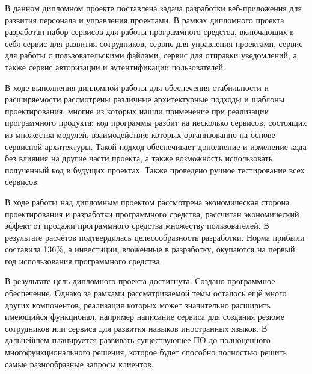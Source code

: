
В данном дипломном проекте поставлена задача разработки веб-при\-ложения для развития персонала и управления проектами. В рамках дипломного проекта разработан набор сервисов для работы программного средства, включающих в себя сервис для развития сотрудников, сервис для управления проектами, сервис для работы с пользовательскими файлами, сервис для отправки уведомлений, а также сервис авторизации и аутентификации пользователей.

В ходе выполнения дипломной работы для обеспечения стабильности и расширяемости рассмотрены различные архитектурные подходы и шаблоны проектирования, многие из которых нашли применение при реализации программного продукта: код программы разбит на несколько сервисов, состоящих из множества модулей, взаимодействие которых организованно на основе сервисной архитектуры. Такой подход обеспечивает дополнение и изменение кода без влияния на другие части проекта, а также возможность использовать полученный код в будущих проектах. Также проведено ручное тестирование всех сервисов.

В ходе работы над дипломным проектом рассмотрена экономическая сторона проектирования и разработки программного средства, рассчитан экономический эффект от продажи программного средства множеству пользователей. В результате расчётов подтвердилась целесообразность разработки. Норма прибыли составила 136\%, а инвестиции, вложенные в разработку, окупаются на первый год использования программного средства.

В результате цель дипломного проекта достигнута. Создано программное обеспечение. Однако за рамками рассматриваемой темы осталось ещё много других компонентов, реализация которых может значительно расширить имеющийся функционал, например написание сервиса для создания резюме сотрудников или сервиса для развития навыков иностранных языков. В дальнейшем планируется развивать существующее ПО до полноценного многофункционального решения, которое будет способно полностью решить самые разнообразные запросы клиентов.
